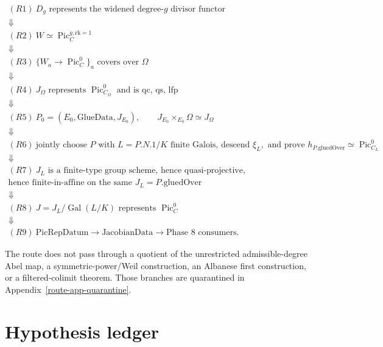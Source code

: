 \[
\begin{gathered}
  (R1)\ D_g\text{ represents the widened degree-}g\text{ divisor functor}\\
  \Downarrow\\
  (R2)\ W\simeq \operatorname{Pic}^{g,\mathrm{rk}=1}_C\\
  \Downarrow\\
  (R3)\ \{W_a\to\operatorname{Pic}^0_C\}_{a}\text{ covers over }\Omega\\
  \Downarrow\\
  (R4)\ J_\Omega\text{ represents }\operatorname{Pic}^0_{C_\Omega}
    \text{ and is qc, qs, lfp}\\
  \Downarrow\\
  (R5)\ P_0=(E_0,\mathrm{GlueData},J_{E_0}),\qquad
       J_{E_0}\times_{E_0}\Omega\simeq J_\Omega\\
  \Downarrow\\[-2pt]
  \boxed{(R6)\ \text{jointly choose }P\text{ with }L=P.N.1/K
    \text{ finite Galois, descend }\xi_L,
    \text{ and prove }h_{P.\mathrm{gluedOver}}
      \simeq\operatorname{Pic}^0_{C_L}}\\
  \Downarrow\\
  (R7)\ J_L\text{ is a finite-type group scheme, hence quasi-projective,}\\
       \text{hence finite-in-affine on the same }J_L=P.\mathrm{gluedOver}\\
  \Downarrow\\
  (R8)\ J=J_L/\operatorname{Gal}(L/K)\text{ represents }
        \operatorname{Pic}^0_C\\
  \Downarrow\\
  (R9)\ \mathrm{PicRepDatum}\longrightarrow\mathrm{JacobianData}
       \longrightarrow\text{Phase 8 consumers}.
\end{gathered}
\]

The route does not pass through a quotient of the unrestricted
admissible-degree Abel map, a symmetric-power/Weil construction, an Albanese
first construction, or a filtered-colimit theorem.  Those branches are
quarantined in Appendix~\ref{route-app-quarantine}.

\section{Hypothesis ledger}

